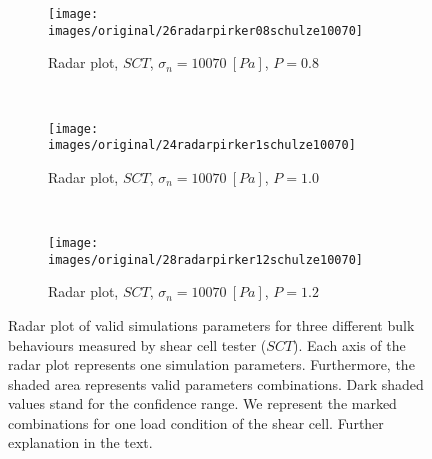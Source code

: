 \begin{figure}[htp] \centering
        \begin{subfigure}[b]{0.5\columnwidth}
        \texttt{[image: images/original/26radarpirker08schulze10070]}
        \caption{Radar plot, $SCT$, $\sigma_n=10070 ~[Pa]$, $P=0.8$}
        \label{fig:26radarpirker08schulze10070} 
    \end{subfigure}\\
     \begin{subfigure}[b]{0.5\columnwidth}
        \texttt{[image: images/original/24radarpirker1schulze10070]}
        \caption{Radar plot, $SCT$, $\sigma_n=10070 ~[Pa]$, $P=1.0$}
        \label{fig:24radarpirker1schulze10070}
    \end{subfigure} \\
        \begin{subfigure}[b]{0.5\columnwidth}
        \texttt{[image: images/original/28radarpirker12schulze10070]}
        \caption{Radar plot, $SCT$, $\sigma_n=10070 ~[Pa]$, $P=1.2$}
        \label{fig:28radarpirker12schulze10070} 
    \end{subfigure}
    \caption[Radar plot of valid simulations parameters for three different
    bulk behaviours measured by SCT]{Radar plot of valid simulations parameters for three different
    bulk behaviours measured by shear cell tester ($SCT$).
    Each axis of the radar plot represents one simulation parameters.
    Furthermore, the shaded area represents valid parameters combinations.
    Dark shaded values stand for the confidence range.
    We represent the marked combinations for one load condition of the shear
    cell.
    Further explanation in the text.
   }
    \label{fig:29schulzeradarandcloud}
\end{figure}
% 
